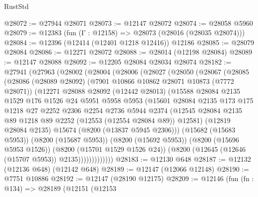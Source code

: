 \begin{lexlean}{RustStd}
\begin{coremodule}
@28072 := @27944 @28071
@28073 := @12147 @28072
@28074 := @28058 @5960
@28079 := @12383 (fun (Γ : @12158) => @28073 (@28016 (@28035 @28074)))
@28084 := @12396 (@12414 (@12401 @1218 @12416)) @12186
@28085 := @28079 @28084
@28086 := @12271 @28072
@28088 := @28014 (@12198 @28084)
@28089 := @12147 @28088
@28092 := @12205 @28084 @28034 @28074
@28182 := @27941
    (@27963
      (@28002
        (@28004
          (@28006
            (@28027
              (@28050
                (@28067
                  (@28085
                    (@28086
                      (@28089 @28092)
                      (@7901 @10866 @10862 @28071 @10873 (@7772 @28071))
                      (@12271
                        @28088
                        @28092
                        (@12442 @28013)
                        (@15588
                          @28084
                          @2135
                          @1529
                          @176
                          @1526
                          @24
                          @5951
                          @5958
                          @5953
                          (@15601
                            @28084
                            @2135
                            @173
                            @175
                            @1218
                            @27
                            @2252
                            @2306
                            @2254
                            @2736
                            @5944
                            @2374
                            (@12545
                              @28084
                              @2135
                              @89
                              @1218
                              @89
                              @2252
                              (@12553 (@12554 @28084 @89))
                              @12581)
                            (@12819 @28084 @2135)
                            @15674
                            (@8200 (@13837 @5945 @2306)))
                          (@15682 (@15683 @5953))
                          (@8200 (@15687 @5953))
                          (@8200 (@15692 @5953))
                          (@8200 (@15696 @5953 @1526))
                          (@8200 (@15701 @1529 @1526 @24))
                          (@8200 (@12645 (@12646 (@15707 @5953)) @2135)))))))))))))
@28183 := @12130 @648
@28187 := @12132 (@12136 @648) (@12142 @648)
@28189 := @12147 (@12066 @12148)
@28190 := @7751 @10886
@28192 := @12147 (@28190 @12175)
@28209 := @12146
    (fun (fn : @134) =>
    @28189
      (@12151
        (@12153

\end{coremodule}
\end{lexlean}
